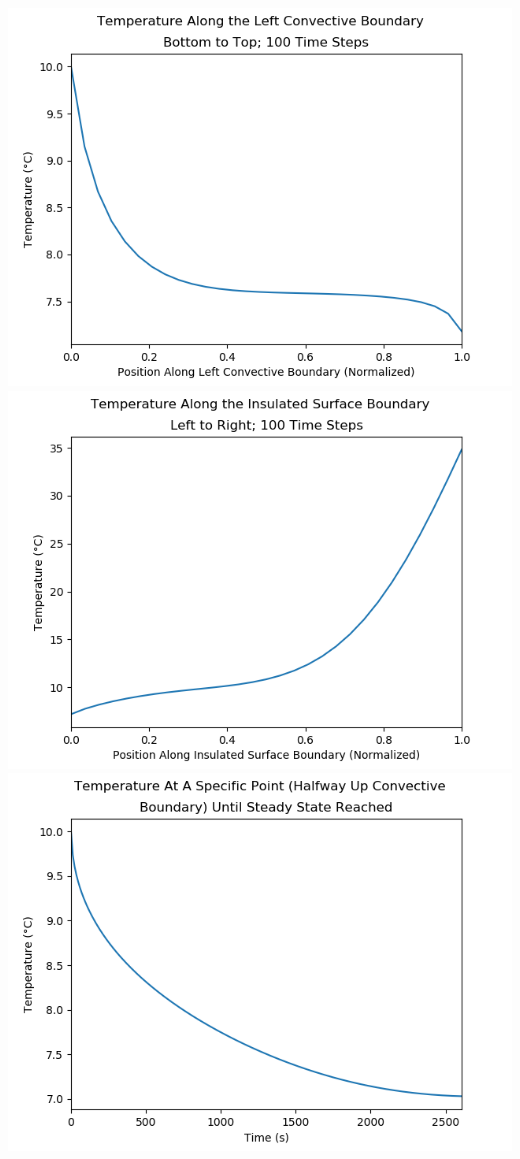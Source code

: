 \documentclass[12pt]{article}
\begin{document}
\includegraphics[width=\textwidth]{Problem-Set-5-Figure-1.png}
\clearpage
\includegraphics[width=\textwidth]{Problem-Set-5-Figure-2.png}
\clearpage
\includegraphics[width=\textwidth]{Problem-Set-5-Figure-3.png}
\end{document}

